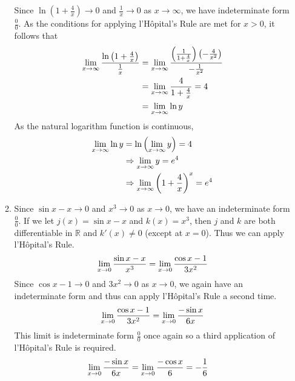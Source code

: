 \documentclass[12pt]{amsart}
\begin{document}
\begin{enumerate}
\begin{enumerate}
			Since $\ln\left(1+\frac{4}{x}\right) \rightarrow 0$ and $\frac{1}{x} \rightarrow 0$ as $x
			\rightarrow \infty$, we have indeterminate form $\frac{0}{0}$. As the conditions for applying 
			l'H\^{o}pital's Rule are met for $x>0$, it follows that
				\begin{align}
					\lim_{x\rightarrow\infty} \frac{\ln \left(1+\frac{4}{x}\right)}{\frac{1}{x}} & = 
					\lim_{x\rightarrow\infty} \frac{\left(\frac{1}{1+\frac{4}{x}}\right)\left(-\frac{4}{x^2}\right)}
					{-\frac{1}{x^2}} \notag \\
					& = \lim_{x\rightarrow\infty} \frac{4}{1+\frac{4}{x}} = 4 \notag \\
					& = \lim_{x\rightarrow\infty} \ln y \notag 
				\end{align}
			As the natural logarithm function is continuous,
				\begin{align}
					\lim_{x\rightarrow\infty} \ln y & = \ln\left(\lim_{x\rightarrow\infty} y\right) = 4 \notag \\
					& \Rightarrow \lim_{x\rightarrow\infty} y = e^4 \notag \\
					& \Rightarrow \lim_{x\rightarrow\infty} \left(1+\frac{4}{x}\right)^x = e^4 \notag
				\end{align}
				
			\item Since $\sin x - x \rightarrow 0$ and $x^3 \rightarrow 0$ as $x \rightarrow 0$, we have an
			indeterminate form $\frac{0}{0}$. If we let $j(x)=\sin x - x$ and $k(x)=x^3$, then $j$ and $k$ 				are both differentiable in $\mathbb{R}$ and $k'(x) \ne 0$ (except at $x=0$). Thus we can apply 
			l'H\^{o}pital's Rule. 
				\begin{align}
					\lim_{x\rightarrow0} \frac{\sin x-x}{x^3} = \lim_{x\rightarrow0} \frac{\cos x-1}{3x^2}
					\notag
				\end{align}
			Since $\cos x-1 \rightarrow 0$ and $3x^2 \rightarrow 0$ as $x \rightarrow 0$, we again have
			an indeterminate form and thus can apply l'H\^{o}pital's Rule a second time.	
				\begin{align}
					\lim_{x\rightarrow0} \frac{\cos x-1}{3x^2} = \lim_{x\rightarrow0} \frac{-\sin x}{6x}							\notag
				\end{align}
			This limit is indeterminate form $\frac{0}{0}$ once again so a third application of l'H\^{o}pital's 				Rule is required.
				\begin{align}
					\lim_{x\rightarrow0} \frac{-\sin x}{6x}	& = \lim_{x\rightarrow0} \frac{-\cos x}{6} = 
					-\frac{1}{6} \notag
				\end{align}
				

\end{enumerate}
\end{enumerate}
\end{document}
